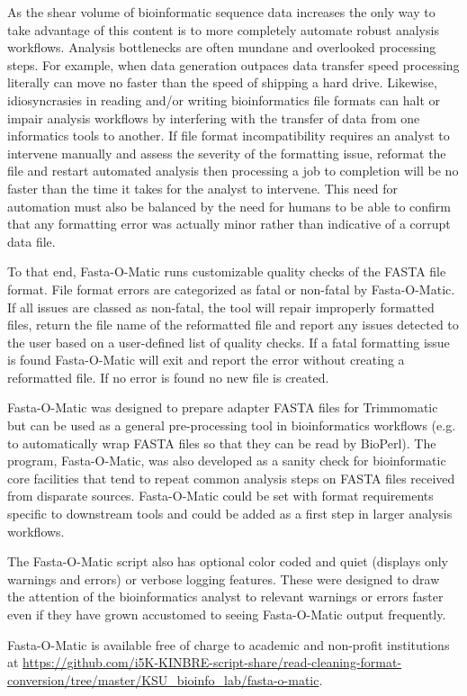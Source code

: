 As the shear volume of bioinformatic sequence data increases the only way to take advantage of this content is to more completely automate robust analysis workflows. Analysis bottlenecks are often mundane and overlooked processing steps. For example, when data generation outpaces data transfer speed processing literally can move no faster than the speed of shipping a hard drive. Likewise, idiosyncrasies in reading and/or writing bioinformatics file formats can halt or impair analysis workflows by interfering with the transfer of data from one informatics tools to another. If file format incompatibility requires an analyst to intervene manually and assess the severity of the formatting issue, reformat the file and restart automated analysis then processing a job to completion will be no faster than the time it takes for the analyst to intervene. This need for automation must also be balanced by the need for humans to be able to confirm that any formatting error was actually minor rather than indicative of a corrupt data file. 

To that end, Fasta-O-Matic runs customizable quality checks of the FASTA file format. File format errors are categorized as fatal or non-fatal by Fasta-O-Matic.  If all issues are classed as non-fatal, the tool will repair improperly formatted files, return the file name of the reformatted file and report any issues detected to the user based on a user-defined list of quality checks. If a fatal formatting issue is found Fasta-O-Matic will exit and report the error without creating a reformatted file. If no error is found no new file is created.

Fasta-O-Matic was designed to prepare adapter FASTA files for Trimmomatic but can be used as a general pre-processing tool in bioinformatics workflows (e.g. to automatically wrap FASTA files so that they can be read by BioPerl). The program, Fasta-O-Matic, was also developed as a sanity check for bioinformatic core facilities that tend to repeat common analysis steps on FASTA files received from disparate sources. Fasta-O-Matic could be set with format requirements specific to downstream tools and could be added as a first step in larger analysis workflows.

The Fasta-O-Matic script also has optional color coded and quiet (displays only warnings and errors) or verbose logging features. These were designed to draw the attention of the bioinformatics analyst to relevant warnings or errors faster even if they have grown accustomed to seeing Fasta-O-Matic output frequently.

Fasta-O-Matic is available free of charge to academic and non-profit institutions at \url{https://github.com/i5K-KINBRE-script-share/read-cleaning-format-conversion/tree/master/KSU\_bioinfo\_lab/fasta-o-matic}.
  